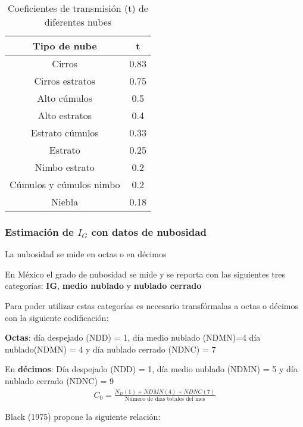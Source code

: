 \begin{table}[h!]
    \centering
    \begin{tabular}{@{}cc@{}}
    \toprule
    Tipo de nube            & t    \\ \midrule
    Cirros                  & 0.83 \\
    Cirros estratos         & 0.75 \\
    Alto cúmulos            & 0.5  \\
    Alto estratos           & 0.4  \\
    Estrato cúmulos         & 0.33 \\
    Estrato                 & 0.25 \\
    Nimbo estrato           & 0.2  \\
    Cúmulos y cúmulos nimbo & 0.2  \\
    Niebla                  & 0.18 \\ \bottomrule
    \end{tabular}
    \caption{Coeficientes de transmisión (t) de diferentes nubes}
    \label{tabma13}
\end{table}
\subsubsection{Estimación de $I_G$ con datos de nubosidad}
La nubosidad se mide en octas o en décimos

En México el grado de nubosidad se mide y se
reporta con las siguientes tres categorías: \textbf{IG}, \textbf{medio nublado} y \textbf{nublado cerrado}

Para poder utilizar estas categorías es necesario transfórmalas a octas o décimos con la siguiente codificación:

\textbf{Octas}: día despejado (NDD) = 1, día medio nublado (NDMN)=4 día nublado(NDMN) = 4 y día nublado cerrado (NDNC) = 7

En \textbf{décimos}: Día despejado (NDD) = 1, día medio nublado (NDMN) = 5 y día nublado cerrado (NDNC) = 9
\begin{align}
    C_0 =\frac{N_D(1) + NDMN(4) + NDNC(7)}{\text{Número de días totales del mes}}
\end{align}

Black (1975) propone la siguiente relación:

